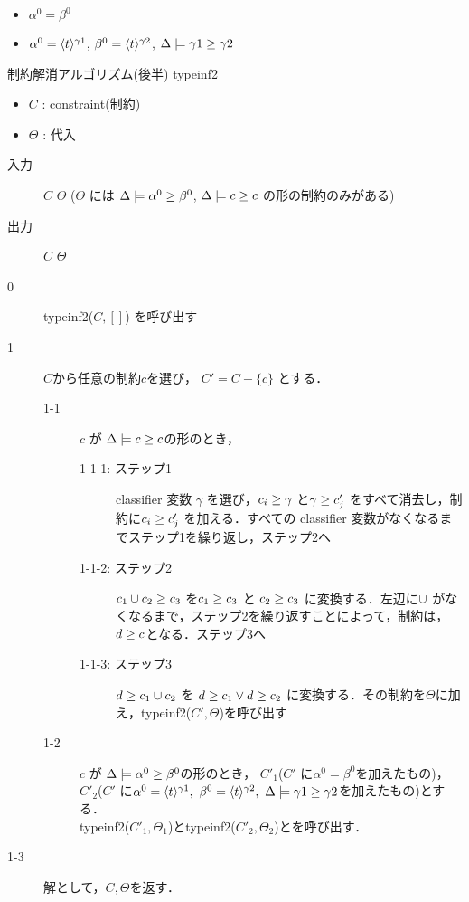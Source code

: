 \begin{itemize}
\item $\alpha^0 = \beta^0$
\item
  $\alpha^0 = \langle{t}\rangle^{\gamma1}$,
  $\beta^0 = \langle{t}\rangle^{\gamma2}$,
  $\Delta \models {\gamma1} \ge {\gamma2}$
\end{itemize}

\begin{oframed}
  制約解消アルゴリズム(後半) typeinf2
  \begin{itemize}
    \setlength{\itemsep}{-5pt}
  \item $C$ : constraint(制約)
  \item $\Theta$ : 代入
  \end{itemize}

  \begin{description}
  \item[入力] $C$ $\Theta$ ($\Theta$ には $\Delta \models {\alpha^0} \ge {\beta^0}$, $\Delta \models {c} \ge {c}$ の形の制約のみがある)
  \item[出力] $C$ $\Theta$
  \end{description}

  \begin{description}
  \item[0] typeinf2($C, []$) を呼び出す
  \item[1] $C$から任意の制約$c$を選び， $C' = C - \{c\}$ とする．
    \begin{description}
    \item[1-1] $c$ が $\Delta \models {c} \ge {c}$の形のとき，
      \begin{description}
        \item[1-1-1: ステップ1] classifier 変数 $\gamma$ を選び，${c_i} \ge {\gamma}$ と${\gamma} \ge {c'_j}$ をすべて消去し，制約に${c_i} \ge {c'_j}$ を加える．すべての classifier 変数がなくなるまでステップ1を繰り返し，ステップ2へ
        \item[1-1-2: ステップ2] ${c_1 \cup c_2} \ge {c_3}$ を${c_1} \ge {c_3}$ と ${c_2} \ge {c_3}$ に変換する．左辺に$\cup$ がなくなるまで，ステップ2を繰り返すことによって，制約は， ${d} \ge {c}$となる．ステップ3へ
        \item[1-1-3: ステップ3] ${d} \ge {c_1 \cup c_2}$ を ${d} \ge {c_1} \vee {d} \ge {c_2}$ に変換する．その制約を$\Theta$に加え，typeinf2($C', \Theta$)を呼び出す
      \end{description}
    \item[1-2] $c$ が $\Delta \models {\alpha^0} \ge {\beta^0}$の形のとき，
      $C'_1$($C'$ に$\alpha^0 = \beta^0$を加えたもの)，\\
      $C'_2$($C'$ に$\alpha^0 = \langle{t}\rangle^{\gamma1},~ \beta^0 = \langle{t}\rangle^{\gamma2},~ \Delta \models {\gamma1} \ge {\gamma2}$を加えたもの)とする．\\
      typeinf2($C'_1, \Theta_1$)とtypeinf2($C'_2, \Theta_2$)とを呼び出す．
    \end{description}
    \item[1-3] 解として，$C, \Theta$を返す．
  \end{description}
\end{oframed}

